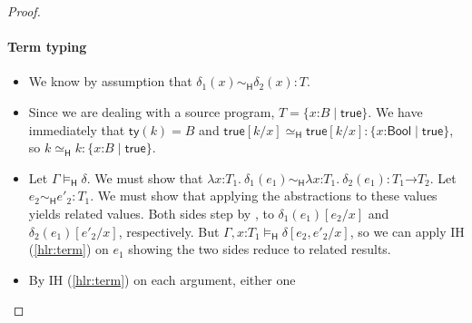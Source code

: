 \documentclass[9pt]{extarticle}
\newcommand{\ottnt}[1]{\mathit{#1}}
\newcommand{\ottsym}[1]{#1}
\begin{document}
{\begin{lemma}
\begin{proof}
{    \paragraph{Term typing \fbox{$ \Gamma   \vdash _{  \mathsf{C}  }  \ottnt{e}  :  \ottnt{T} $}}
    \begin{itemize}
    \item[\T{Var}] We know by assumption that $ \delta_{{\mathrm{1}}}  \ottsym{(}  \mathit{x}  \ottsym{)}   \sim _{  \mathsf{H}  }  \delta_{{\mathrm{2}}}  \ottsym{(}  \mathit{x}  \ottsym{)}  :  \ottnt{T} $.
    \item[\T{Const}] Since we are dealing with a source program, $\ottnt{T}  \ottsym{=}   \{ \mathit{x} \mathord{:} \ottnt{B} \mathrel{\mid}  \mathsf{true}  \} $. We have immediately that $ \mathsf{ty} ( \ottnt{k} )   \ottsym{=}  \ottnt{B}$ and
      $   \mathsf{true}   [  \ottnt{k} / \mathit{x}  ]    \simeq _{  \mathsf{H}  }    \mathsf{true}   [  \ottnt{k} / \mathit{x}  ]   :   \{ \mathit{x} \mathord{:}  \mathsf{Bool}  \mathrel{\mid}  \mathsf{true}  \}  $, so $ \ottnt{k}   \simeq _{  \mathsf{H}  }  \ottnt{k}  :   \{ \mathit{x} \mathord{:} \ottnt{B} \mathrel{\mid}  \mathsf{true}  \}  $.
    \item[\T{Abs}] Let $ \Gamma   \models _{  \mathsf{H}  }  \delta $. We must show that
      $  \lambda \mathit{x} \mathord{:} \ottnt{T_{{\mathrm{1}}}} .~  \delta_{{\mathrm{1}}}  \ottsym{(}  \ottnt{e_{{\mathrm{1}}}}  \ottsym{)}    \sim _{  \mathsf{H}  }   \lambda \mathit{x} \mathord{:} \ottnt{T_{{\mathrm{1}}}} .~  \delta_{{\mathrm{2}}}  \ottsym{(}  \ottnt{e_{{\mathrm{1}}}}  \ottsym{)}   :   \ottnt{T_{{\mathrm{1}}}} \mathord{ \rightarrow } \ottnt{T_{{\mathrm{2}}}}  $. Let $ \ottnt{e_{{\mathrm{2}}}}   \sim _{  \mathsf{H}  }  \ottnt{e'_{{\mathrm{2}}}}  :  \ottnt{T_{{\mathrm{1}}}} $. We must show that applying the abstractions to
      these values yields related values. Both sides step by ,
      to $ \delta_{{\mathrm{1}}}  \ottsym{(}  \ottnt{e_{{\mathrm{1}}}}  \ottsym{)}  [  \ottnt{e_{{\mathrm{2}}}} / \mathit{x}  ] $ and $ \delta_{{\mathrm{2}}}  \ottsym{(}  \ottnt{e_{{\mathrm{1}}}}  \ottsym{)}  [  \ottnt{e'_{{\mathrm{2}}}} / \mathit{x}  ] $,
      respectively. But $  \Gamma , \mathit{x} \mathord{:} \ottnt{T_{{\mathrm{1}}}}    \models _{  \mathsf{H}  }   \delta  [  \ottnt{e_{{\mathrm{2}}}} , \ottnt{e'_{{\mathrm{2}}}} / \mathit{x}  ]  $, so we can
      apply IH (\ref{hlr:term}) on $\ottnt{e_{{\mathrm{1}}}}$ showing the two sides reduce to
      related results.
    \item[\T{Op}] By IH (\ref{hlr:term}) on each argument, either one

\end{itemize}}
\end{proof}
\end{lemma}}
\end{document}
